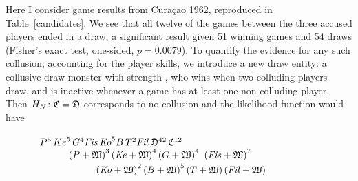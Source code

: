 \documentclass[review]{elsarticle}
\begin{document}
 \begin{table}
 \caption{Cura\c{c}ao 1962 \label{candidates} Candidates, World Chess Championship 1963}
 \end{table}

Here I consider game results from Cura\c{c}ao 1962, reproduced in
Table~\ref{candidates}.  We see that all twelve of the games between
the three accused players ended in a draw, a significant result given
51 winning games and 54 draws (Fisher's exact test, one-sided,
$p=0.0079$).  To quantify the evidence for any such collusion,
accounting for the player skills, we introduce a new draw entity: a
collusive draw monster with strength \cdraw, who wins when two
colluding players draw, and is inactive whenever a game has at least
one non-colluding player.  Then $H_N\colon\mathfrak{C}=\mathfrak{D}$ corresponds to
no collusion and the likelihood function would have

\begin{equation}\parbox{4in}{$
P^5\,
{Ke}^5\,
G^4
\mathit{Fis}\,  %
\mathit{Ko}^5
B\,
T^2  %
\mathit{Fil}\,
\draw^{42}\,\cdraw^{12}\oo\\ \rule{10mm}{0mm}
\left(P+\white\right)^3
\left(\mathit{Ke}+\white\right)^4
\left(G+\white\right)^4\
\left(\mathit{Fis}+\white\right)^7\oo\\ \rule{20mm}{0mm}
\left(\mathit{Ko}+\white\right)^2
\left(B+\white\right)^5
\left(T+\white\right)
\left(\mathit{Fil}+\white\right)\oo
$}\end{equation}
\end{document}
